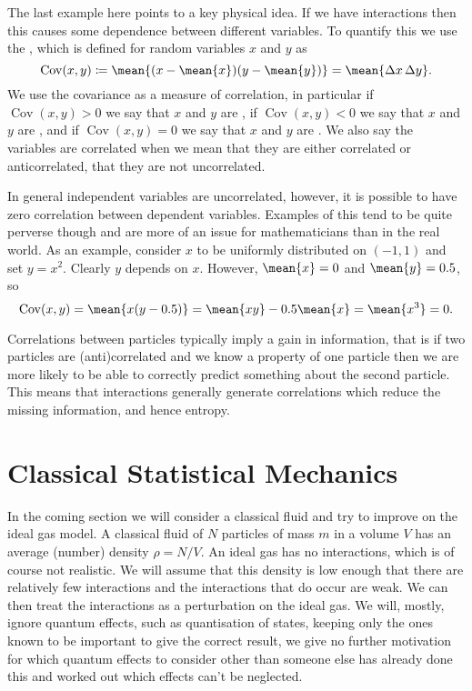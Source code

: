 \documentclass[fleqn]{NotesClass}
\DeclareMathOperator{\Cov}{Cov}
\begin{document}
    The last example here points to a key physical idea.
    If we have interactions then this causes some dependence between different variables.
    To quantify this we use the , which is defined for random variables \(x\) and \(y\) as
    \begin{equation}
        \Cov(x, y) \coloneqq \mean{(x - \mean{x})(y - \mean{y})} = \mean{\Delta x\, \Delta y}.
    \end{equation}
    We use the covariance as a measure of correlation, in particular if \(\Cov(x, y) > 0\) we say that \(x\) and \(y\) are , if \(\Cov(x, y) < 0\) we say that \(x\) and \(y\) are , and if \(\Cov(x, y) = 0\) we say that \(x\) and \(y\) are .
    We also say the variables are correlated when we mean that they are either correlated or anticorrelated, that they are not uncorrelated.
    
    In general independent variables are uncorrelated, however, it is possible to have zero correlation between dependent variables.
    Examples of this tend to be quite perverse though and are more of an issue for mathematicians than in the real world.
    As an example, consider \(x\) to be uniformly distributed on \((-1, 1)\) and set \(y = x^2\).
    Clearly \(y\) depends on \(x\).
    However, \(\mean{x} = 0\) and \(\mean{y} = 0.5\), so
    \begin{equation}
        \Cov(x, y) = \mean{x(y - 0.5)} = \mean{xy} - 0.5\mean{x} = \mean{x^3} = 0.
    \end{equation}
    
    Correlations between particles typically imply a gain in information, that is if two particles are (anti)correlated and we know a property of one particle then we are more likely to be able to correctly predict something about the second particle.
    This means that interactions generally generate correlations which reduce the missing information, and hence entropy.
    
    \section{Classical Statistical Mechanics}\label{sec:classical stat mech}
    In the coming section we will consider a classical fluid and try to improve on the ideal gas model.
    A classical fluid of \(N\) particles of mass \(m\) in a volume \(V\) has an average (number) density \(\rho = N/V\).
    An ideal gas has no interactions, which is of course not realistic.
    We will assume that this density is low enough that there are relatively few interactions and the interactions that do occur are weak.
    We can then treat the interactions as a perturbation on the ideal gas.
    We will, mostly, ignore quantum effects, such as quantisation of states, keeping only the ones known to be important to give the correct result, we give no further motivation for which quantum effects to consider other than someone else has already done this and worked out which effects can't be neglected.
    
\end{document}

